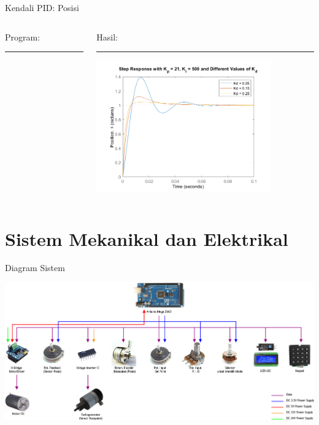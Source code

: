 \documentclass[10pt,xcolor={dvipsnames}]{beamer}
\begin{document}
		\begin{frame}{Kendali PID: Posisi}
			\begin{columns}[T] %
				\begin{column}{0.48\textwidth}
					Program:
					\color{black}\rule{\linewidth}{4pt}
					
				\end{column}%
				\hfill%
				\begin{column}{0.48\textwidth}
					Hasil:
					\color{blue}\rule{\linewidth}{4pt}
					\begin{center}
						\includegraphics[width=7.5cm]{Matlab/PIDpos.png}
					\end{center}
				\end{column}
			\end{columns}
		\end{frame}
		\section{Sistem Mekanikal dan Elektrikal}
		\begin{frame}{Diagram Sistem}
			\begin{center}
				\includegraphics[width=15cm]{Gambar Lain/topologi.png}
			\end{center}
		\end{frame}
	
\end{document}
